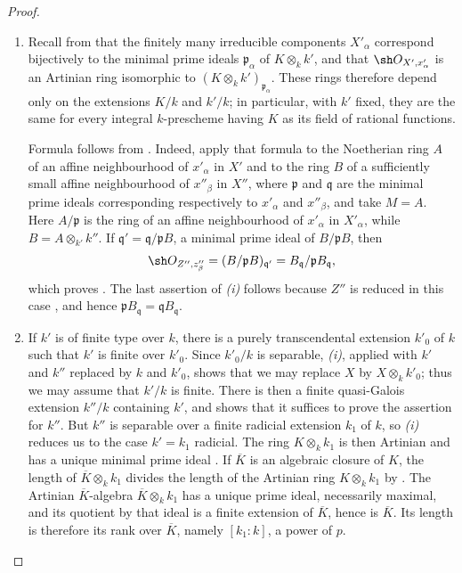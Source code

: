 \begin{proof}
\begin{enumerate}
\item[\rm(i)]
Recall from  that the finitely many irreducible
components $X'_\alpha$ correspond bijectively to the minimal prime
ideals $\mathfrak p_\alpha$ of $K\otimes_k k'$, and that
$\sh O_{X',x'_\alpha}$ is an Artinian ring isomorphic to
$(K\otimes_k k')_{\mathfrak p_\alpha}$.
These rings therefore depend only on the extensions $K/k$ and $k'/k$;
in particular, with $k'$ fixed, they are the same for every integral
$k$-prescheme having $K$ as its field of rational functions.

Formula  follows from .
Indeed, apply that formula to the Noetherian ring $A$ of an affine
neighbourhood of $x'_\alpha$ in $X'$ and to the ring $B$ of a
sufficiently small affine neighbourhood of $x''_\beta$ in $X''$,
where $\mathfrak p$ and $\mathfrak q$ are the minimal prime ideals
corresponding respectively to $x'_\alpha$ and $x''_\beta$, and take
$M=A$.
Here $A/\mathfrak p$ is the ring of an affine neighbourhood of
$x'_\alpha$ in $X'_\alpha$, while $B=A\otimes_{k'}k''$.
If $\mathfrak q'=\mathfrak q/\mathfrak pB$, a minimal prime ideal of
$B/\mathfrak pB$, then
\[
\sh O_{Z'',z''_\beta}
=(B/\mathfrak pB)_{\mathfrak q'}
=B_{\mathfrak q}/\mathfrak pB_{\mathfrak q},
\]
which proves .
The last assertion of \emph{(i)} follows because $Z''$ is reduced in
this case , and hence
$\mathfrak pB_{\mathfrak q}=\mathfrak qB_{\mathfrak q}$.

\item[\rm(ii)]
If $k'$ is of finite type over $k$, there is a purely transcendental
extension $k'_0$ of $k$ such that $k'$ is finite over $k'_0$.
Since $k'_0/k$ is separable, \emph{(i)}, applied with $k'$ and $k''$
replaced by $k$ and $k'_0$, shows that we may replace $X$ by
$X\otimes_k k'_0$; thus we may assume that $k'/k$ is finite.
There is then a finite quasi-Galois extension $k''/k$ containing
$k'$, and  shows that it suffices to prove the
assertion for $k''$.
But $k''$ is separable over a finite radicial extension $k_1$ of $k$,
so \emph{(i)} reduces us to the case $k'=k_1$ radicial.
The ring $K\otimes_k k_1$ is then Artinian and has a unique minimal
prime ideal .
If $\overline K$ is an algebraic closure of $K$, the length of
$\overline K\otimes_k k_1$ divides the length of the Artinian ring
$K\otimes_k k_1$ by .
The Artinian $\overline K$-algebra
$\overline K\otimes_k k_1$ has a unique prime ideal, necessarily
maximal, and its quotient by that ideal is a finite extension of
$\overline K$, hence is $\overline K$.
Its length is therefore its rank over $\overline K$, namely
$[k_1:k]$, a power of $p$.


\end{enumerate}
\end{proof}
